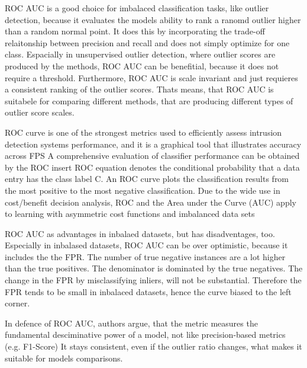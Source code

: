 
ROC AUC is a good choice for imbalaced classification tasks, like outlier detection, because it evaluates the models ability to rank a ranomd outlier higher than a random normal point.
It does this by incorporating the trade-off relaitonship between precision and recall and does not simply optimize for one class.
Espacially in unsupervised outlier detection, where outlier scores are produced by the methods, ROC AUC can be benefitial, because it does not require a threshold.
Furthermore, ROC AUC is scale invariant and just requieres a consistent ranking of the outlier scores. 
Thats means, that ROC AUC is suitabele for comparing different methods, that are producing different types of outlier score scales. 


ROC curve is one of the strongest metrics used to efficiently assess intrusion detection systems performance, and it is a graphical tool that illustrates accuracy across FPS \citep[postfix]{nassif2021}
A comprehensive evaluation of classifier performance can be obtained by the ROC insert ROC equation denotes the conditional probability that a data entry has the class label C. 
An ROC curve plots the classification results from the most positive to the most negative classification. 
Due to the wide use in cost/benefit decision analysis, ROC and the Area under the Curve (AUC) apply to learning with asymmetric cost functions and imbalanced data sets


ROC AUC as advantages in inbalaed datasets, but has disadventages, too.
Especially in inbalased datasets, ROC AUC can be over optimistic, because it includes the the FPR.
The number of true negative instances are a lot higher than the true positives. 
The denominator is dominated by the true negatives. \citep{davis2006relationship} 
The change in the FPR by misclassifying inliers, will not be substantial. 
Therefore the FPR tends to be small in inbalaced datasets, hence the curve biased to the left corner.


In defence of ROC AUC, authors  argue, that the metric measures the fundamental desciminative power of a model, not like precision-based metrics (e.g. F1-Score)
It stays consistent, even if the outlier ratio changes, what makes it suitable for models comparisons. 



